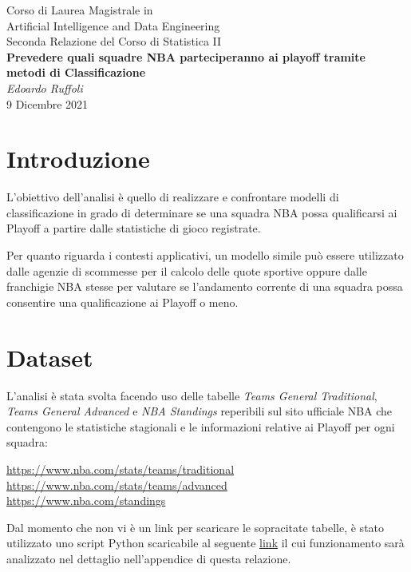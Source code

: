 \documentclass[11pt,a4paper]{article}
\begin{document}
\begin{center}
	\Large{Corso di Laurea Magistrale in \\
	Artificial Intelligence and	Data Engineering}\\
	\vspace{0.2cm}
	\large{Seconda Relazione del Corso di Statistica II}\\
	\vspace{0.5cm}
	\Large\textbf{Prevedere quali squadre NBA parteciperanno ai playoff tramite metodi di Classificazione}\\
	\vspace{0.5cm}
	\large\emph{Edoardo Ruffoli}\\
	\vspace{0.5cm}
	\normalsize{9 Dicembre 2021}
\end{center}

\tableofcontents
\newpage
\section{Introduzione}
L'obiettivo dell'analisi è quello di realizzare e confrontare modelli di classificazione in grado di determinare se una squadra NBA possa qualificarsi ai Playoff a partire dalle statistiche di gioco registrate. 

Per quanto riguarda i contesti applicativi, un modello simile può essere utilizzato dalle agenzie di scommesse per il calcolo delle quote sportive oppure dalle franchigie NBA stesse per valutare se l'andamento corrente di una squadra possa consentire una qualificazione ai Playoff o meno.

\section{Dataset}
L'analisi è stata svolta facendo uso delle tabelle \emph{Teams General Traditional}, \emph{Teams General Advanced} e \emph{NBA Standings} reperibili sul sito ufficiale NBA che contengono le statistiche stagionali e le informazioni relative ai Playoff per ogni squadra:
\begin{center}
    \url{https://www.nba.com/stats/teams/traditional}\\
    \url{https://www.nba.com/stats/teams/advanced}\\
    \url{https://www.nba.com/standings}\\
\end{center}

Dal momento che non vi è un link per scaricare le sopracitate tabelle, è stato utilizzato uno script Python scaricabile al seguente \href{https://raw.githubusercontent.com/edoardoruffoli/Statistics/master/SecondProject/nba_stats_scraper_v2.py}{link} il cui funzionamento sarà analizzato nel dettaglio nell'appendice di questa relazione.
\end{document}
